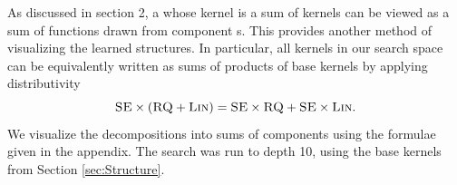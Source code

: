 \documentclass[twoside]{article}
\renewcommand{\TBD}[1]{}
\begin{document}
As discussed in section 2, a \gp{} whose kernel is a sum of kernels can be viewed as a sum of functions drawn from component \gp{}s.
This provides another method of visualizing the learned structures.
In particular, all kernels in our search space can be equivalently written as sums of products of base kernels by applying distributivity \eg
\[{\textsc{SE} \times (\textsc{RQ} + \textsc{Lin}) = \textsc{SE} \times \textsc{RQ} + \textsc{SE} \times \textsc{Lin}}.\]
We visualize the decompositions into sums of components using the formulae given in the appendix.
%
%
%
%
%
The search was run to depth 10, using the base kernels from Section \ref{sec:Structure}.



\end{document}
